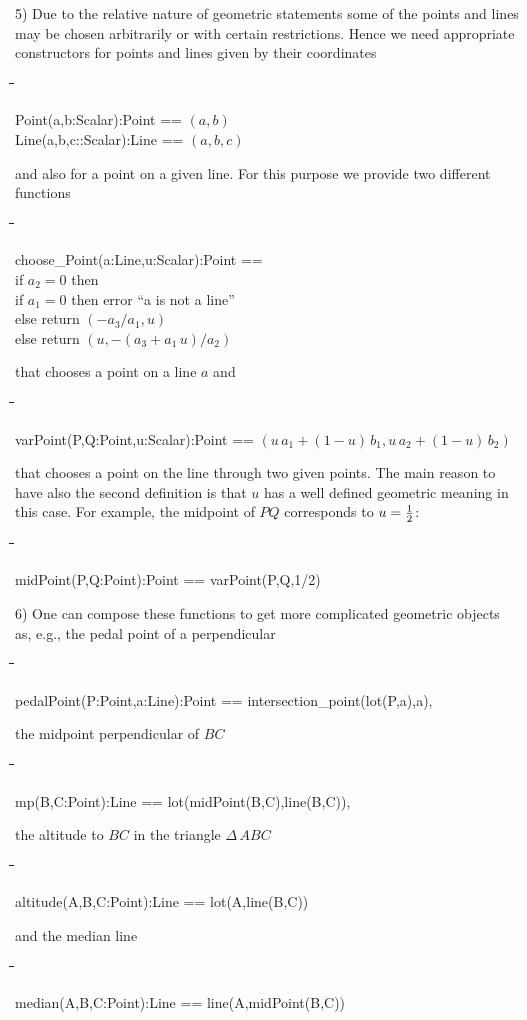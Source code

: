 \documentclass{article}
\newenvironment{code}{\tt \begin{tabbing}
\hspace*{1cm}\=\hspace*{1cm}\=\hspace*{1cm}\=
\hspace*{1cm}\=\hspace*{1cm}\=\kill
}{\end{tabbing}}
\begin{document}
5) Due to the relative nature of geometric statements some of the
points and lines may be chosen arbitrarily or with certain
restrictions. Hence we need appropriate constructors for points and
lines given by their coordinates
\begin{code}
Point(a,b:Scalar):Point == $(a,b)$\\
Line(a,b,c::Scalar):Line == $(a,b,c)$
\end{code}
and also for a point on a given line. For this purpose we provide two
different functions
\begin{code}
choose\_Point(a:Line,u:Scalar):Point == \+\\
if $a_{2}=0$ then\+\\ 
if $a_{1}=0$ then error ``a is not a line''\\
else return $(-a_{3}/a_{1},u)$\-\\
else return $(u,-(a_{3}+a_1\,u)/a_{2})$
\end{code}
that chooses a point on a line $a$ and
\begin{code}
varPoint(P,Q:Point,u:Scalar):Point == 
$(u\,a_{1}+(1-u)\,b_{1},u\,a_{2}+(1-u)\,b_{2})$
\end{code}
that chooses a point on the line through two given points. The main
reason to have also the second definition is that $u$ has a well
defined geometric meaning in this case. For example, the midpoint of
$PQ$ corresponds to $u={1\over 2}$:
\begin{code}
midPoint(P,Q:Point):Point == varPoint(P,Q,1/2)
\end{code}

6) One can compose these functions to get more complicated geometric
objects as, e.g., the pedal point of a perpendicular
\begin{code}
pedalPoint(P:Point,a:Line):Point == intersection\_point(lot(P,a),a),
\end{code}
the midpoint perpendicular of $BC$ 
\begin{code}
mp(B,C:Point):Line == lot(midPoint(B,C),line(B,C)),
\end{code}
the altitude to $BC$ in the triangle $\Delta\,ABC$
\begin{code}
altitude(A,B,C:Point):Line == lot(A,line(B,C))
\end{code}
and the median line
\begin{code}
median(A,B,C:Point):Line == line(A,midPoint(B,C))
\end{code}
\end{document}
